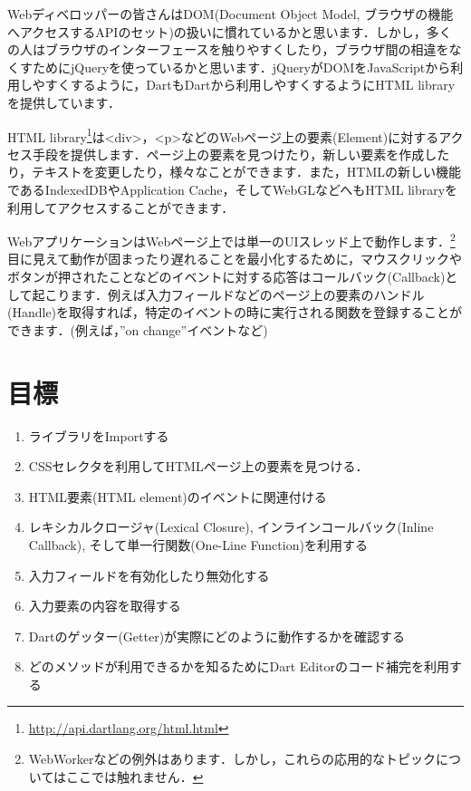 
Webディベロッパーの皆さんはDOM(Document Object Model, ブラウザの機能へアクセスするAPIのセット)の扱いに慣れているかと思います．しかし，多くの人はブラウザのインターフェースを触りやすくしたり，ブラウザ間の相違をなくすためにjQueryを使っているかと思います．jQueryがDOMをJavaScriptから利用しやすくするように，DartもDartから利用しやすくするようにHTML libraryを提供しています．

HTML library\footnote{\url{http://api.dartlang.org/html.html}}は<div>，<p>などのWebページ上の要素(Element)に対するアクセス手段を提供します．ページ上の要素を見つけたり，新しい要素を作成したり，テキストを変更したり，様々なことができます．また，HTMLの新しい機能であるIndexedDBやApplication Cache，そしてWebGLなどへもHTML libraryを利用してアクセスすることができます．

WebアプリケーションはWebページ上では単一のUIスレッド上で動作します．\footnote{WebWorkerなどの例外はあります．しかし，これらの応用的なトピックについてはここでは触れません．}目に見えて動作が固まったり遅れることを最小化するために，マウスクリックやボタンが押されたことなどのイベントに対する応答はコールバック(Callback)として起こります．例えば入力フィールドなどのページ上の要素のハンドル(Handle)を取得すれば，特定のイベントの時に実行される関数を登録することができます．(例えば，''on change''イベントなど)

\section{目標}

\begin{enumerate}
\item ライブラリをImportする
\item CSSセレクタを利用してHTMLページ上の要素を見つける．
\item HTML要素(HTML element)のイベントに関連付ける
\item レキシカルクロージャ(Lexical Closure), インラインコールバック(Inline Callback), そして単一行関数(One-Line Function)を利用する
\item 入力フィールドを有効化したり無効化する
\item 入力要素の内容を取得する
\item Dartのゲッター(Getter)が実際にどのように動作するかを確認する
\item どのメソッドが利用できるかを知るためにDart Editorのコード補完を利用する
\end{enumerate}


